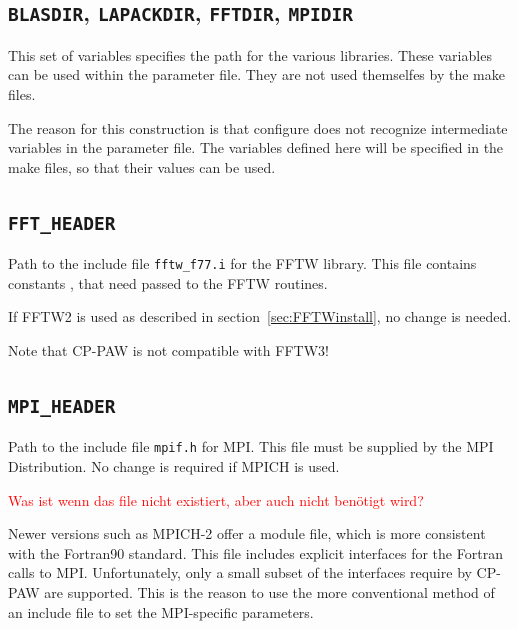 \documentclass[a4paper,10pt]{report}
\newcommand{\mytt}[1]{{\tt #1}}
\begin{document}
\subsection{\mytt{BLASDIR}, \mytt{LAPACKDIR}, \mytt{FFTDIR}, \mytt{MPIDIR}}

This set of variables specifies the path for the various
libraries. These variables can be used within the parameter file. They
are not used themselfes by the make files.

The reason for this construction is that configure does not recognize
intermediate variables in the parameter file. The variables defined
here will be specified in the make files, so that their values can be used.

\subsection{\mytt{FFT\_HEADER}}
Path to the include file \mytt{fftw\_f77.i} for the FFTW library.
This file contains constants , that need passed to the FFTW routines.

If FFTW2 is used as described in section~\ref{sec:FFTWinstall}, no change is needed.

Note that CP-PAW is not compatible with FFTW3!

\subsection{\mytt{MPI\_HEADER}}
Path to the include file \mytt{mpif.h} for MPI. This file must be
supplied by the MPI Distribution. No change is required if MPICH is
used.

\textcolor{red}{ Was ist wenn das file nicht existiert, aber auch
nicht ben\"otigt wird?}

Newer versions such as MPICH-2 offer a module file, which is more
consistent with the Fortran90 standard. This file includes explicit
interfaces for the Fortran calls to MPI. Unfortunately, only a small
subset of the interfaces require by CP-PAW are supported. This is the
reason to use the more conventional method of an include file to set
the MPI-specific parameters.

\end{document}
